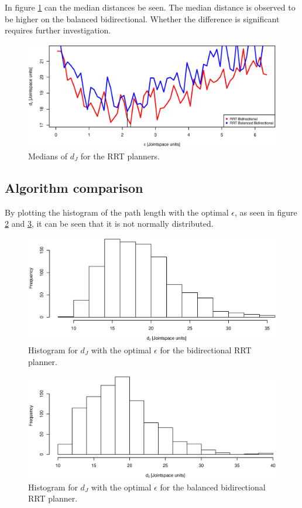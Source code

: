 In figure \ref{fig:medians} can the median distances be seen. 
The median distance is observed to be higher on the balanced bidirectional. 
Whether the difference is significant requires further investigation.

\begin{figure}[H]
 \centering
 \includegraphics[width=\figsize]{graphics/compare_distance}
 \caption{Medians of \(d_J\) for the RRT planners.}
 \label{fig:medians}
\end{figure}
\subsection{Algorithm comparison}

By plotting the histogram of the path length with the optimal \(\epsilon\), as seen in figure \ref{fig:bidir_histogram} and \ref{fig:balanced_histogram}, 
it can be seen that it is not normally distributed. 

\begin{figure}[H]
 \centering
 \includegraphics[width=\figsize]{graphics/hist_op_bi}
 \caption{Histogram for \(d_J\) with the optimal \(\epsilon\) for the bidirectional RRT planner.}
 \label{fig:bidir_histogram}
\end{figure}

\begin{figure}[H]
 \centering
 \includegraphics[width=\figsize]{graphics/hist_op_ba}
 \caption{Histogram for \(d_J\) with the optimal \(\epsilon\) for the balanced bidirectional RRT planner.}
 \label{fig:balanced_histogram}
\end{figure}

